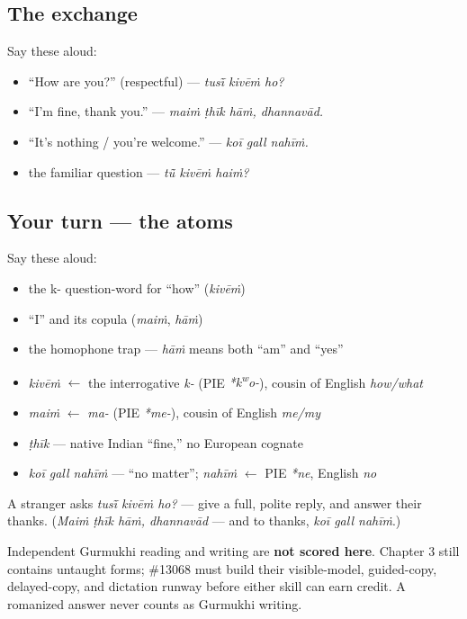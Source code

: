 \subsection*{The exchange}
Say these aloud:

\begin{itemize}
\raggedright
  \item \textquotedblleft{}How are you?\textquotedblright{} (respectful) — \emph{tusī̃ kivēṁ ho?}
  \item \textquotedblleft{}I'm fine, thank you.\textquotedblright{} — \emph{maiṁ ṭhīk hāṁ, dhannavād.}
  \item \textquotedblleft{}It's nothing / you're welcome.\textquotedblright{} — \emph{koī gall nahīṁ.}
  \item the familiar question — \emph{tū̃ kivēṁ haiṁ?}
\end{itemize}

\subsection*{Your turn — the atoms}
Say these aloud:

\begin{itemize}
\raggedright
  \item the k- question-word for \textquotedblleft{}how\textquotedblright{} (\emph{kivēṁ})
  \item \textquotedblleft{}I\textquotedblright{} and its copula (\emph{maiṁ}, \emph{hāṁ})
  \item the homophone trap — \emph{hāṁ} means both \textquotedblleft{}am\textquotedblright{} and \textquotedblleft{}yes\textquotedblright{}
\end{itemize}

\begin{cousinweb}
\begin{itemize}
\raggedright
  \item \emph{kivēṁ} $\leftarrow$ the interrogative \emph{k-} (PIE \emph{*k\textsuperscript{w}o-}), cousin of English \emph{how/what}
  \item \emph{maiṁ} $\leftarrow$ \emph{ma-} (PIE \emph{*me-}), cousin of English \emph{me/my}
  \item \emph{ṭhīk} — native Indian \textquotedblleft{}fine,\textquotedblright{} no European cognate
  \item \emph{koī gall nahīṁ} — \textquotedblleft{}no matter\textquotedblright{}; \emph{nahīṁ} $\leftarrow$ PIE \emph{*ne}, English \emph{no}
\end{itemize}
\end{cousinweb}

\begin{tcolorbox}[breakable,colback=teal!4,colframe=teal!35!black,title={Before you move on}]
A stranger asks \emph{tusī̃ kivēṁ ho?} — give a full, polite reply, and answer their thanks. (\emph{Maiṁ ṭhīk hāṁ, dhannavād} — and to thanks, \emph{koī gall nahīṁ}.)

Independent Gurmukhi reading and writing are \textbf{not scored here}. Chapter 3 still contains untaught forms; \#13068 must build their visible-model, guided-copy, delayed-copy, and dictation runway before either skill can earn credit. A romanized answer never counts as Gurmukhi writing.
\end{tcolorbox}
